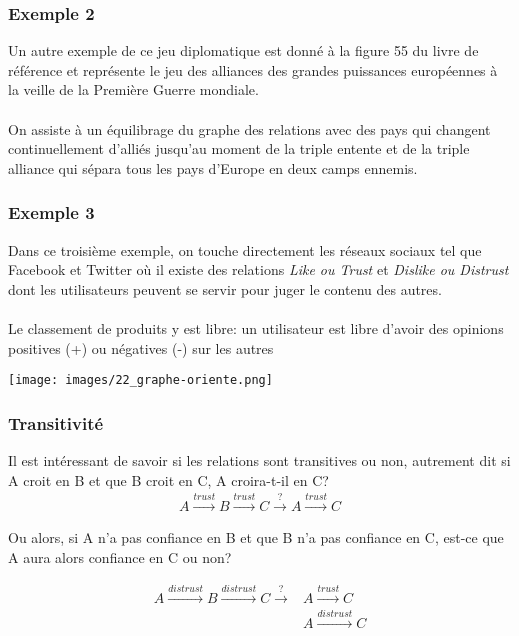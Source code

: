 \subsubsection*{Exemple 2}
Un autre exemple de ce jeu diplomatique est donné à la figure 55 du livre de référence et représente le jeu des alliances des grandes puissances européennes à la veille de la Première Guerre mondiale. 
\paragraph{}
 On assiste à un équilibrage du graphe des relations avec des pays qui changent continuellement d'alliés jusqu'au moment de la triple entente et de la triple alliance qui sépara tous les pays d'Europe en deux camps ennemis.

\subsubsection*{Exemple 3}
Dans ce troisième exemple, on touche directement les réseaux sociaux tel que Facebook et Twitter où il existe des relations \textit{Like ou Trust} et \textit{Dislike ou Distrust} dont les utilisateurs peuvent se servir pour juger le contenu des autres.
\paragraph{}
Le classement de produits y est libre: un utilisateur est libre d'avoir des opinions positives (+) ou négatives (-) sur les autres


\texttt{[image: images/22\_graphe-oriente.png]}

\subsubsection*{Transitivité}  

Il est intéressant de savoir si les relations sont transitives ou non, autrement dit si A croit en B et que B croit en C, A croira-t-il en C?
\begin{align*}
A \overset{trust}{\longrightarrow} B \overset{trust}{\longrightarrow} C \overset{?}{\longrightarrow} A \overset{trust}{\longrightarrow} C
\end{align*}

Ou alors, si A n'a pas confiance en B et que B n'a pas confiance en C, est-ce que A aura alors confiance en C ou non?


\begin{align*}
A \overset{distrust}{\longrightarrow} B \overset{distrust}{\longrightarrow} C \overset{?}{\longrightarrow} &A \overset{trust}{\longrightarrow} C\\
&A \overset{distrust}{\longrightarrow} C
\end{align*}

